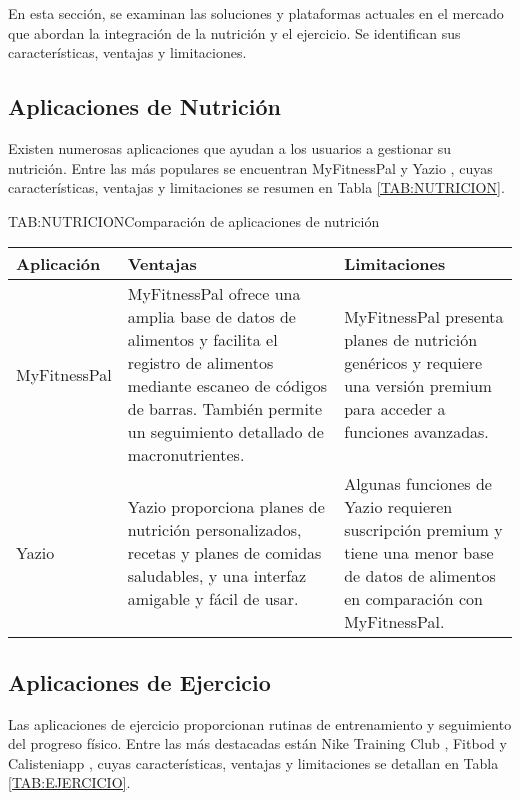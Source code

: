 En esta sección, se examinan las soluciones y plataformas actuales en el mercado que abordan la integración de la nutrición y el ejercicio. Se identifican sus características, ventajas y limitaciones.

\subsection{Aplicaciones de Nutrición}

Existen numerosas aplicaciones que ayudan a los usuarios a gestionar su nutrición. Entre las más populares se encuentran MyFitnessPal \cite{MyFitnessPal} y Yazio \cite{Yazio}, cuyas características, ventajas y limitaciones se resumen en Tabla \ref{TAB:NUTRICION}.

\begin{table}[Comparación de aplicaciones de nutrición]{TAB:NUTRICION}{Comparación de aplicaciones de nutrición}
  \begin{tabular}{|p{3cm}|p{5cm}|p{5cm}|}
    \hline
    \textbf{Aplicación} & \textbf{Ventajas} & \textbf{Limitaciones} \\
    \hline
    MyFitnessPal & MyFitnessPal ofrece una amplia base de datos de alimentos y facilita el registro de alimentos mediante escaneo de códigos de barras. También permite un seguimiento detallado de macronutrientes. & MyFitnessPal presenta planes de nutrición genéricos y requiere una versión premium para acceder a funciones avanzadas. \\
    \hline
    Yazio & Yazio proporciona planes de nutrición personalizados, recetas y planes de comidas saludables, y una interfaz amigable y fácil de usar. & Algunas funciones de Yazio requieren suscripción premium y tiene una menor base de datos de alimentos en comparación con MyFitnessPal. \\
    \hline
  \end{tabular}
\end{table}

\subsection{Aplicaciones de Ejercicio}

Las aplicaciones de ejercicio proporcionan rutinas de entrenamiento y seguimiento del progreso físico. Entre las más destacadas están Nike Training Club \cite{NikeTrainingClub}, Fitbod \cite{Fitbod} y Calisteniapp \cite{Calisteniapp}, cuyas características, ventajas y limitaciones se detallan en Tabla \ref{TAB:EJERCICIO}.

